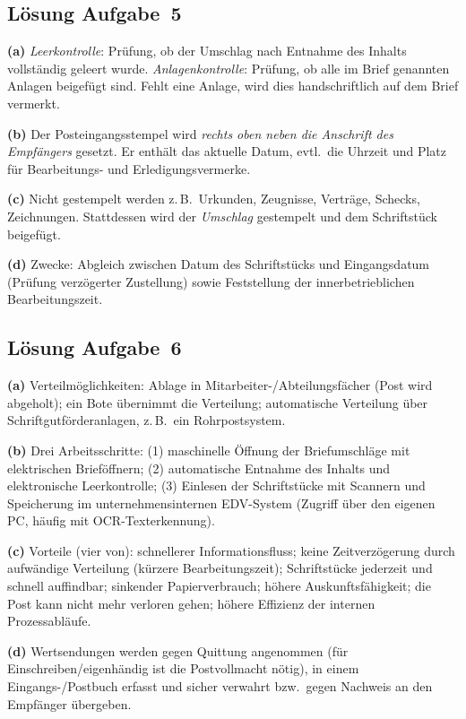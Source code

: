 \documentclass[11pt, a4paper]{article}
\begin{document}
\subsection*{Lösung Aufgabe~5}
\begin{loesung}
\textbf{(a)} \emph{Leerkontrolle}: Prüfung, ob der Umschlag nach Entnahme des Inhalts
vollständig geleert wurde. \emph{Anlagenkontrolle}: Prüfung, ob alle im Brief genannten
Anlagen beigefügt sind. Fehlt eine Anlage, wird dies handschriftlich auf dem Brief vermerkt.

\textbf{(b)} Der Posteingangsstempel wird \emph{rechts oben neben die Anschrift des
Empfängers} gesetzt. Er enthält das aktuelle Datum, evtl.\ die Uhrzeit und Platz für
Bearbeitungs- und Erledigungsvermerke.

\textbf{(c)} Nicht gestempelt werden z.\,B.\ Urkunden, Zeugnisse, Verträge, Schecks,
Zeichnungen. Stattdessen wird der \emph{Umschlag} gestempelt und dem Schriftstück beigefügt.

\textbf{(d)} Zwecke: Abgleich zwischen Datum des Schriftstücks und Eingangsdatum (Prüfung
verzögerter Zustellung) sowie Feststellung der innerbetrieblichen Bearbeitungszeit.
\end{loesung}

\subsection*{Lösung Aufgabe~6}
\begin{loesung}
\textbf{(a)} Verteilmöglichkeiten: Ablage in Mitarbeiter-/Abteilungsfächer (Post wird
abgeholt); ein Bote übernimmt die Verteilung; automatische Verteilung über
Schriftgutförderanlagen, z.\,B.\ ein Rohrpostsystem.

\textbf{(b)} Drei Arbeitsschritte: (1) maschinelle Öffnung der Briefumschläge mit elektrischen
Brieföffnern; (2) automatische Entnahme des Inhalts und elektronische Leerkontrolle; (3)
Einlesen der Schriftstücke mit Scannern und Speicherung im unternehmensinternen EDV-System
(Zugriff über den eigenen PC, häufig mit OCR-Texterkennung).

\textbf{(c)} Vorteile (vier von): schnellerer Informationsfluss; keine Zeitverzögerung durch
aufwändige Verteilung (kürzere Bearbeitungszeit); Schriftstücke jederzeit und schnell
auffindbar; sinkender Papierverbrauch; höhere Auskunftsfähigkeit; die Post kann nicht mehr
verloren gehen; höhere Effizienz der internen Prozessabläufe.

\textbf{(d)} Wertsendungen werden gegen Quittung angenommen (für Einschreiben/eigenhändig ist
die Postvollmacht nötig), in einem Eingangs-/Postbuch erfasst und sicher verwahrt bzw.\ gegen
Nachweis an den Empfänger übergeben.
\end{loesung}
\end{document}
